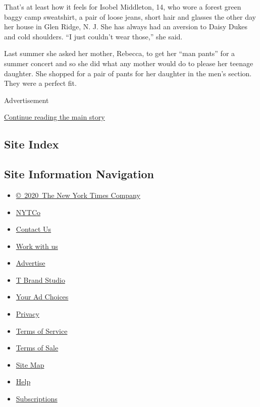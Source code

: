 That's at least how it feels for Isobel Middleton, 14, who wore a forest
green baggy camp sweatshirt, a pair of loose jeans, short hair and
glasses the other day her house in Glen Ridge, N. J. She has always had
an aversion to Daisy Dukes and cold shoulders. ``I just couldn't wear
those,'' she said.

Last summer she asked her mother, Rebecca, to get her ``man pants'' for
a summer concert and so she did what any mother would do to please her
teenage daughter. She shopped for a pair of pants for her daughter in
the men's section. They were a perfect fit.

Advertisement

\protect\hyperlink{after-bottom}{Continue reading the main story}

\hypertarget{site-index}{%
\subsection{Site Index}\label{site-index}}

\hypertarget{site-information-navigation}{%
\subsection{Site Information
Navigation}\label{site-information-navigation}}

\begin{itemize}
\tightlist
\item
  \href{https://help.nytimes.com/hc/en-us/articles/115014792127-Copyright-notice}{©~2020~The
  New York Times Company}
\end{itemize}

\begin{itemize}
\tightlist
\item
  \href{https://www.nytco.com/}{NYTCo}
\item
  \href{https://help.nytimes.com/hc/en-us/articles/115015385887-Contact-Us}{Contact
  Us}
\item
  \href{https://www.nytco.com/careers/}{Work with us}
\item
  \href{https://nytmediakit.com/}{Advertise}
\item
  \href{http://www.tbrandstudio.com/}{T Brand Studio}
\item
  \href{https://www.nytimes.com/privacy/cookie-policy\#how-do-i-manage-trackers}{Your
  Ad Choices}
\item
  \href{https://www.nytimes.com/privacy}{Privacy}
\item
  \href{https://help.nytimes.com/hc/en-us/articles/115014893428-Terms-of-service}{Terms
  of Service}
\item
  \href{https://help.nytimes.com/hc/en-us/articles/115014893968-Terms-of-sale}{Terms
  of Sale}
\item
  \href{https://spiderbites.nytimes.com}{Site Map}
\item
  \href{https://help.nytimes.com/hc/en-us}{Help}
\item
  \href{https://www.nytimes.com/subscription?campaignId=37WXW}{Subscriptions}
\end{itemize}
